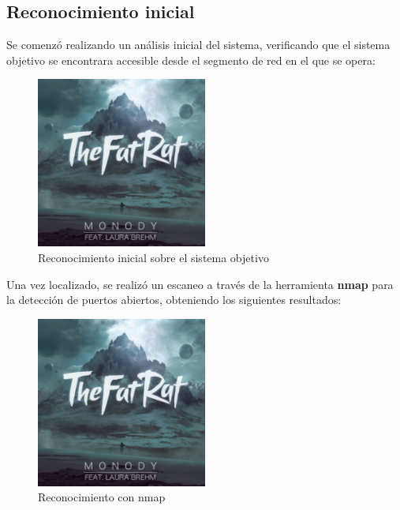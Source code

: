 \documentclass[a4paper]{article}
\begin{document}
  \subsection{Reconocimiento inicial}
  Se comenzó realizando un análisis inicial del sistema, verificando que el sistema objetivo se encontrara accesible desde el segmento de red en el que se opera:\par
  \begin{figure}[h]
    \begin{center}
      \includegraphics[width=0.5\textwidth]{img/thefatrat-ft.laura-brehm-monody.jpg}
    \end{center}
    \caption{Reconocimiento inicial sobre el sistema objetivo}
  \end{figure}
  Una vez localizado, se realizó un escaneo a través de la herramienta \textbf{nmap} para la detección de puertos abiertos, obteniendo los siguientes resultados:
  \begin{figure}[h]
    \begin{center}
      \includegraphics[width=0.5\textwidth]{img/thefatrat-ft.laura-brehm-monody.jpg}
    \end{center}
    \caption{Reconocimiento con nmap}
  \end{figure}
  \newpage
\end{document}
